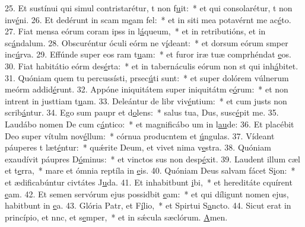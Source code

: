 25. Et sustínui qui simul contristarétur, t non f\uline{u}it:~* et qui consolarétur, t non inv\uline{é}ni.
26. Et dedérunt in scam m\uline{e}am fel:~* et in siti mea potavérnt me ac\uline{é}to.
27. Fiat mensa eórum coram ipss in l\uline{á}queum,~* et in retributións, et in sc\uline{á}ndalum.
28. Obscuréntur óculi eórm ne v\uline{í}deant:~* et dorsum eórum smper inc\uline{ú}rva.
29. Effúnde super eos ram t\uline{u}am:~* et furor iræ tuæ comprhéndat \uline{e}os.
30. Fiat habitátio eórm des\uline{é}rta:~* et in tabernáculis eórum non st qui inh\uline{á}bitet.
31. Quóniam quem tu percussísti, prsec\uline{ú}ti sunt:~* et super dolórem vúlnerum meórm addid\uline{é}runt.
32. Appóne iniquitátem super iniquitátm e\uline{ó}rum:~* et non intrent in justtiam t\uline{u}am.
33. Deleántur de libr viv\uline{é}ntium:~* et cum justs non scrib\uline{á}ntur.
34. Ego sum paupr et d\uline{o}lens:~* salus tua, Dus, susc\uline{é}pit me.
35. Laudábo nomen De cum c\uline{á}ntico:~* et magnificábo um in l\uline{au}de:
36. Et placébit Deo super vítulm nov\uline{é}llum:~* córnua producntem et \uline{ú}ngulas.
37. Vídeant páuperes t læt\uline{é}ntur:~* quǽrite Deum, et vivet nima v\uline{e}stra.
38. Quóniam exaudívit páupres D\uline{ó}minus:~* et vinctos sus non desp\uline{é}xit.
39. Laudent illum cæl et t\uline{e}rra,~* mare et ómnia reptíla in \uline{e}is.
40. Quóniam Deus salvam fácet S\uline{i}on:~* et ædificabúntur civtátes J\uline{u}da.
41. Et inhabitbunt \uline{i}bi,~* et hereditáte cquírent \uline{e}am.
42. Et semen servórum ejus possidbit \uline{e}am:~* et qui díligunt nomen ejus, habitbunt in \uline{e}a.
43. Glória Patr, et F\uline{í}lio,~* et Spirtui S\uline{a}ncto.
44. Sicut erat in princípio, et nnc, et s\uline{e}mper,~* et in sǽcula sæclórum. \uline{A}men.
